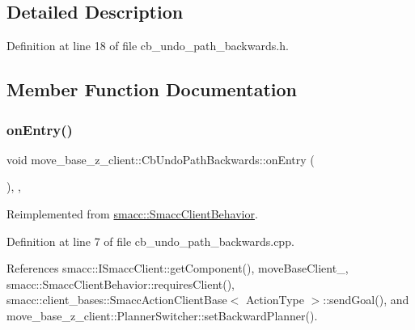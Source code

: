 \subsection{Detailed Description}


Definition at line 18 of file cb\+\_\+undo\+\_\+path\+\_\+backwards.\+h.



\subsection{Member Function Documentation}
\mbox{\label{classmove__base__z__client_1_1CbUndoPathBackwards_a2793c69857aa97337d56ff79dee20508}} 
\subsubsection{\texorpdfstring{on\+Entry()}{onEntry()}}
{\footnotesize\ttfamily void move\+\_\+base\+\_\+z\+\_\+client\+::\+Cb\+Undo\+Path\+Backwards\+::on\+Entry (\begin{DoxyParamCaption}{ }\end{DoxyParamCaption})\hspace{0.3cm}{\ttfamily [override]}, {\ttfamily [private]}, {\ttfamily [virtual]}}



Reimplemented from \hyperlink{classsmacc_1_1SmaccClientBehavior_a7962382f93987c720ad432fef55b123f}{smacc\+::\+Smacc\+Client\+Behavior}.



Definition at line 7 of file cb\+\_\+undo\+\_\+path\+\_\+backwards.\+cpp.



References smacc\+::\+I\+Smacc\+Client\+::get\+Component(), move\+Base\+Client\+\_\+, smacc\+::\+Smacc\+Client\+Behavior\+::requires\+Client(), smacc\+::client\+\_\+bases\+::\+Smacc\+Action\+Client\+Base$<$ Action\+Type $>$\+::send\+Goal(), and move\+\_\+base\+\_\+z\+\_\+client\+::\+Planner\+Switcher\+::set\+Backward\+Planner().



